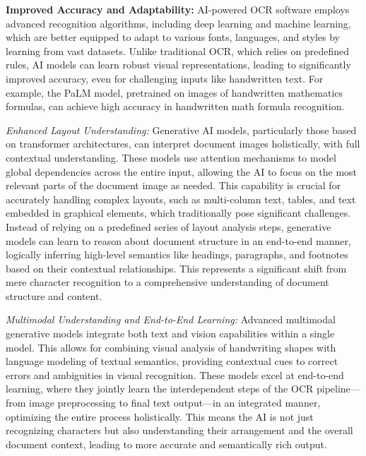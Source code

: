 \textbf{Improved Accuracy and Adaptability:} AI-powered OCR software employs advanced recognition algorithms, including deep learning and machine learning, which are better equipped to adapt to various fonts, languages, and styles by learning from vast datasets. Unlike traditional OCR, which relies on predefined rules, AI models can learn robust visual representations, leading to significantly improved accuracy, even for challenging inputs like handwritten text. \cite{AddeptoAIOCR} \cite{BeyondKeyAIOCR} For example, the PaLM model, pretrained on images of handwritten mathematics formulas, can achieve high accuracy in handwritten math formula recognition. \cite{BeyondKeyAIOCR}

\emph{Enhanced Layout Understanding:} Generative AI models, particularly those based on transformer architectures, can interpret document images holistically, with full contextual understanding. \cite{BeyondKeyAIOCR} These models use attention mechanisms to model global dependencies across the entire input, allowing the AI to focus on the most relevant parts of the document image as needed. \cite{BeyondKeyAIOCR} This capability is crucial for accurately handling complex layouts, such as multi-column text, tables, and text embedded in graphical elements, which traditionally pose significant challenges. \cite{DocuclipperLimitations} \cite{MediumLayoutLMv3} \cite{BeyondKeyAIOCR} Instead of relying on a predefined series of layout analysis steps, generative models can learn to reason about document structure in an end-to-end manner, logically inferring high-level semantics like headings, paragraphs, and footnotes based on their contextual relationships. \cite{BeyondKeyAIOCR} This represents a significant shift from mere character recognition to a comprehensive understanding of document structure and content.

\emph{Multimodal Understanding and End-to-End Learning:} Advanced multimodal generative models integrate both text and vision capabilities within a single model. \cite{BeyondKeyAIOCR} This allows for combining visual analysis of handwriting shapes with language modeling of textual semantics, providing contextual cues to correct errors and ambiguities in visual recognition. \cite{BeyondKeyAIOCR} These models excel at end-to-end learning, where they jointly learn the interdependent steps of the OCR pipeline—from image preprocessing to final text output—in an integrated manner, optimizing the entire process holistically. \cite{BeyondKeyAIOCR} This means the AI is not just recognizing characters but also understanding their arrangement and the overall document context, leading to more accurate and semantically rich output.

